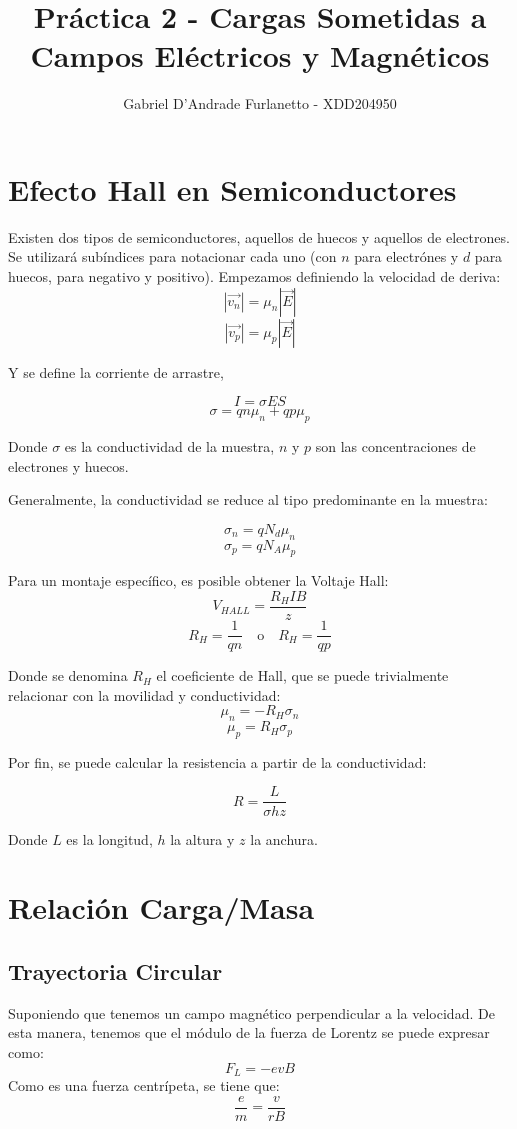\documentclass[a4paper,12pt]{article}
\begin{document}
\title{Práctica 2 - Cargas Sometidas a Campos Eléctricos y Magnéticos}

\author{Gabriel D'Andrade Furlanetto - XDD204950}
\date{}
\maketitle
\section{Efecto Hall en Semiconductores}

Existen dos tipos de semiconductores, aquellos de huecos y aquellos de electrones. Se utilizará subíndices para notacionar cada uno (con $n$ para electrónes y $d$ para huecos, para negativo y positivo). Empezamos definiendo la velocidad de deriva: 
$$|\vec{v_n}| = \mu_n |\vec{E}| $$
$$|\vec{v_p}| = \mu_p |\vec{E}| $$

Y se define la corriente de arrastre,

$$I = \sigma ES$$
$$\sigma = qn\mu_n + qp\mu_p $$

Donde $\sigma$ es la conductividad de la muestra,  $n$ y $p$ son las concentraciones de electrones y huecos.

Generalmente, la conductividad se reduce al tipo predominante en la muestra:

$$\sigma_n = qN_d\mu_n$$
$$\sigma_p = qN_A\mu_p$$

Para un montaje específico, es posible obtener la Voltaje Hall:
$$V_{HALL} = \frac{R_H I B}{z}$$
$$R_H = \frac{1}{qn} \quad \text{o} \quad R_H = \frac{1}{qp}$$

Donde se denomina $R_H$ el coeficiente de Hall, que se puede trivialmente relacionar con la movilidad y conductividad:
$$\mu_n = -R_H \sigma_n$$
$$\mu_p = R_H \sigma_p$$

Por fin, se puede calcular la resistencia a partir de la conductividad:

$$R = \frac{L}{\sigma h z}$$

Donde $L$ es la longitud, $h$ la altura y $z$ la anchura.

\section{Relación Carga/Masa}
\subsection{Trayectoria Circular}
Suponiendo que tenemos un campo magnético perpendicular a la velocidad. De esta manera, tenemos que el módulo de la fuerza de Lorentz se puede expresar como:
$$F_L = -e v B$$
Como es una fuerza centrípeta, se tiene que:
$$\frac{e}{m} = \frac{v}{r B}$$ 
\end{document}
